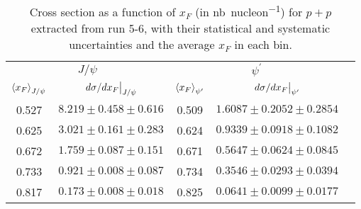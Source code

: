 \documentclass[../main.tex]{subfiles}
\begin{document}
\begin{table}[h!]
	\centering
	\caption{Cross section as a function of $x_F$ (in \unit{\nano\barn\per nucleon}) for $p+p$ extracted from run 5-6, with their statistical and systematic uncertainties and the average $x_F$ in each bin.}
	\begin{tabular}{cc|ccc}
		\hline
		\multicolumn{2}{c|}{$J/\psi$} & \multicolumn{2}{c}{$\psi^{\prime}$} &                                                                      \\ \cline{1-4}
		$\expval{x_F}_{J/\psi}$       & $\eval{d\sigma/dx_F}_{J/\psi}$      & $\expval{x_F}_{\psi^\prime}$ & $\eval{d\sigma/dx_F}_{\psi^\prime}$ & \\ \cline{1-4}
		\multicolumn{1}{c|}{0.527}    & $8.219\pm0.458\pm0.616$             & \multicolumn{1}{c|}{0.509}   & $1.6087\pm0.2052\pm0.2854$          & \\
		\multicolumn{1}{c|}{0.625}    & $3.021\pm0.161\pm0.283$             & \multicolumn{1}{c|}{0.624}   & $0.9339\pm0.0918\pm0.1082$          & \\
		\multicolumn{1}{c|}{0.672}    & $1.759\pm0.087\pm0.151$             & \multicolumn{1}{c|}{0.671}   & $0.5647\pm0.0624\pm0.0845$          & \\
		\multicolumn{1}{c|}{0.733}    & $0.921\pm0.008\pm0.087$             & \multicolumn{1}{c|}{0.734}   & $0.3546\pm0.0293\pm0.0394$          & \\
		\multicolumn{1}{c|}{0.817}    & $0.173\pm0.008\pm0.018$             & \multicolumn{1}{c|}{0.825}   & $0.0641\pm0.0099\pm0.0177$          & \\ \cline{1-4}
	\end{tabular}
\end{table}
\end{document}
